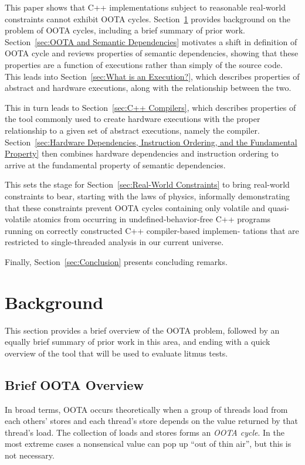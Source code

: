 \documentclass[10]{article}
\begin{document}
This paper shows that C++ implementations subject to reasonable
real-world constraints cannot exhibit OOTA cycles.
Section~\ref{sec:Background}
provides background on the problem of OOTA cycles, including a
brief summary of prior work.
Section~\ref{sec:OOTA and Semantic Dependencies}
motivates a shift in definition of OOTA cycle and reviews properties of
semantic dependencies, showing that these properties are a function of
executions rather than simply of the source code.
This leads into
Section~\ref{sec:What is an Execution?},
which describes properties of abstract and hardware executions, along
with the relationship between the two.

This in turn leads to
Section~\ref{sec:C++ Compilers}, which describes properties of the tool
commonly used to create hardware executions with the proper relationship
to a given set of abstract executions, namely  the compiler.
Section~\ref{sec:Hardware Dependencies, Instruction Ordering, and the
Fundamental Property}
then combines hardware dependencies and instruction ordering to arrive
at the fundamental property of semantic dependencies.

This sets the stage for
Section~\ref{sec:Real-World Constraints}
to bring real-world constraints to bear, starting with the laws of
physics, informally demonstrating that these constraints prevent
OOTA cycles containing only volatile and quasi-volatile atomics from
occurring in undefined-behavior-free C++ programs running on correctly
constructed C++ compiler-based implemen- tations that are restricted to
single-threaded analysis in our current universe.

Finally,
Section~\ref{sec:Conclusion}
presents concluding remarks.

\section{Background}
\label{sec:Background}

This section provides a brief overview of the OOTA problem, followed
by an equally brief summary of prior work in this area, and ending
with a quick overview of the  tool that will be used to
evaluate litmus tests.

\subsection{Brief OOTA Overview}
\label{sec:Brief OOTA Overview}

In broad terms,
OOTA occurs theoretically when a group of threads load from each others' stores
and each thread's store depends on the value returned by that thread's load.
The collection of loads and stores forms an \emph{OOTA cycle}.
In the most extreme cases a nonsensical value can pop up ``out of thin air'',
but this is not necessary.
\end{document}
